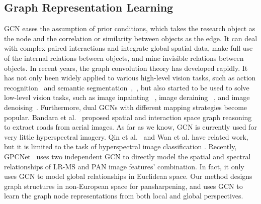 \subsection{Graph Representation Learning}
GCN eases the assumption of prior conditions, which takes the research object as the node and the correlation or similarity between objects as the edge. It can deal with complex paired interactions and integrate global spatial data, make full use of the internal relations between objects, and mine invisible relations between objects.
In recent years, the graph convolution theory has developed
rapidly. It has not only been widely applied to various high-level vision tasks, such as action recognition~\cite{zhao2019semantic} and semantic segmentation~\cite{li2020spatial},~\cite{qi20173d}, but also started to be used to solve low-level vision tasks, such as image inpainting ~\cite{wadhwa2021hyperrealistic}, image deraining ~\cite{fu2021rain}, and image denoising~\cite{valsesia2019image}. Furthermore, dual GCNs \cite{zhang2019dual} with different mapping strategies become popular. Bandara et al.~\cite{bandara2022spin} proposed spatial and interaction space graph reasoning to extract roads from aerial images. As far as we know, GCN is currently used for very little hyperspectral imagery. Qin et al.~\cite{qin2018spectral} and Wan et al. \cite{wan2019multiscale} have related work, but it is limited to the task of hyperspectral image classification \cite{hong2020graph,9484014, kang2020graph}. Recently, GPCNet~\cite{yan2022pansharpening} uses two independent GCN to directly model the spatial and spectral relationships of LR-MS and PAN image features' combination. In fact, it only uses GCN to model global relationships in Euclidean space. Our method designs graph structures in non-European space for pansharpening, and uses GCN to learn the graph node representations from both local and global perspectives.